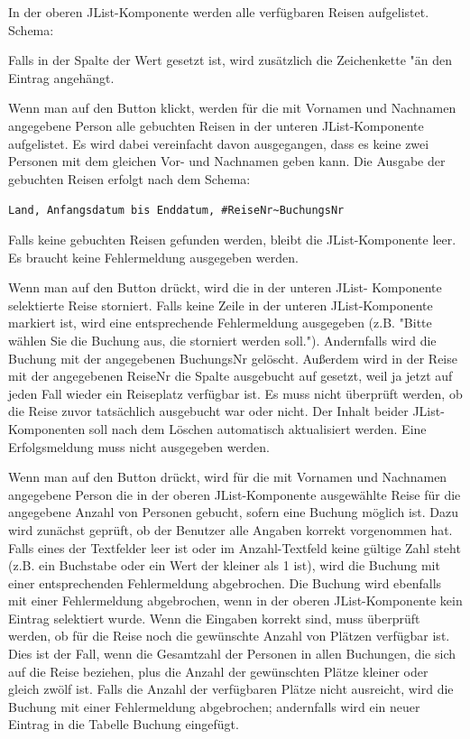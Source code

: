 \begin{compactenum}[a)]
In der oberen JList-Komponente werden alle verfügbaren Reisen aufgelistet. Schema:


Falls in der Spalte  der Wert  gesetzt
ist, wird zusätzlich die Zeichenkette "\" an den
Eintrag angehängt.

Wenn man auf den Button  klickt, werden für die mit
Vornamen und Nachnamen angegebene Person alle gebuchten Reisen in der unteren
JList-Komponente aufgelistet. Es wird dabei vereinfacht davon ausgegangen, dass
es keine zwei Personen mit dem gleichen Vor- und Nachnamen geben kann. Die
Ausgabe der gebuchten Reisen erfolgt nach dem Schema:

\verb|Land, Anfangsdatum bis Enddatum, #ReiseNr~BuchungsNr|

Falls keine gebuchten Reisen gefunden werden, bleibt die JList-Komponente leer.
Es braucht keine Fehlermeldung ausgegeben werden.

Wenn man auf den Button  drückt, wird die in
der unteren JList- Komponente selektierte Reise storniert. Falls keine Zeile in
der unteren JList-Komponente markiert ist, wird eine entsprechende
Fehlermeldung ausgegeben (z.B. "Bitte wählen Sie die Buchung aus, die storniert
werden soll."). Andernfalls wird die Buchung mit der angegebenen BuchungsNr gelöscht.
Außerdem wird in der Reise mit der angegebenen ReiseNr die Spalte ausgebucht
auf  gesetzt, weil ja jetzt auf jeden Fall wieder ein
Reiseplatz verfügbar ist. Es muss nicht überprüft werden, ob die Reise zuvor
tatsächlich ausgebucht war oder nicht. Der Inhalt beider JList-Komponenten soll
nach dem Löschen automatisch aktualisiert werden. Eine Erfolgsmeldung muss
nicht ausgegeben werden.

Wenn man auf den Button  drückt, wird für die mit
Vornamen und Nachnamen angegebene Person die in der oberen JList-Komponente
ausgewählte Reise für die angegebene Anzahl von Personen gebucht, sofern eine
Buchung möglich ist. Dazu wird zunächst geprüft, ob der Benutzer alle Angaben
korrekt vorgenommen hat. Falls eines der Textfelder leer ist oder im
Anzahl-Textfeld keine gültige Zahl steht (z.B. ein Buchstabe oder ein Wert der
kleiner als 1 ist), wird die Buchung mit einer entsprechenden Fehlermeldung
abgebrochen. Die Buchung wird ebenfalls mit einer Fehlermeldung abgebrochen,
wenn in der oberen JList-Komponente kein Eintrag selektiert wurde. Wenn die
Eingaben korrekt sind, muss überprüft werden, ob für die Reise noch die
gewünschte Anzahl von Plätzen verfügbar ist. Dies ist der Fall, wenn die
Gesamtzahl der Personen in allen Buchungen, die sich auf die Reise beziehen,
plus die Anzahl der gewünschten Plätze kleiner oder gleich zwölf ist. Falls die
Anzahl der verfügbaren Plätze nicht ausreicht, wird die Buchung mit einer
Fehlermeldung abgebrochen; andernfalls wird ein neuer Eintrag in die Tabelle
Buchung eingefügt.


\end{compactenum}
